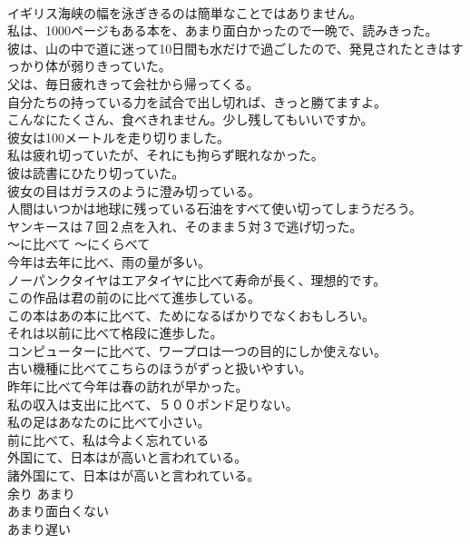 \documentclass[8pt]{extreport}
\begin{document}
\begin{CJK}{UTF8}{min}
\\	イギリス海峡の幅を泳ぎきるのは簡単なことではありません。  
\\	私は、1000ページもある本を、あまり面白かったので一晩で、読みきった。   
\\	彼は、山の中で道に迷って10日間も水だけで過ごしたので、発見されたときはすっかり体が弱りきっていた。  
\\	父は、毎日疲れきって会社から帰ってくる。  
\\	自分たちの持っている力を試合で出し切れば、きっと勝てますよ。  
\\	こんなにたくさん、食べきれません。少し残してもいいですか。  
\\	彼女は100メートルを走り切りました。  
\\	私は疲れ切っていたが、それにも拘らず眠れなかった。  
\\	彼は読書にひたり切っていた。   
\\	彼女の目はガラスのように澄み切っている。  
\\	人間はいつかは地球に残っている石油をすべて使い切ってしまうだろう。  
\\	ヤンキースは７回２点を入れ、そのまま５対３で逃げ切った。  
\\	〜に比べて	〜にくらべて	
\\	今年は去年に比べ、雨の量が多い。  
\\	ノーパンクタイヤはエアタイヤに比べて寿命が長く、理想的です。  
\\	この作品は君の前のに比べて進歩している。   
\\	この本はあの本に比べて、ためになるばかりでなくおもしろい。   
\\	それは以前に比べて格段に進歩した。   
\\	コンピューターに比べて、ワープロは一つの目的にしか使えない。   
\\	古い機種に比べてこちらのほうがずっと扱いやすい。   
\\	昨年に比べて今年は春の訪れが早かった。   
\\	私の収入は支出に比べて、５００ポンド足りない。   
\\	私の足はあなたのに比べて小さい。  
\\	前に比べて、私は今よく忘れている  
\\	外国にて、日本はが高いと言われている。  
\\	諸外国にて、日本はが高いと言われている。  
\\	余り	あまり	
\\	あまり面白くない 
\\	あまり遅い 

\end{CJK}
\end{document}
